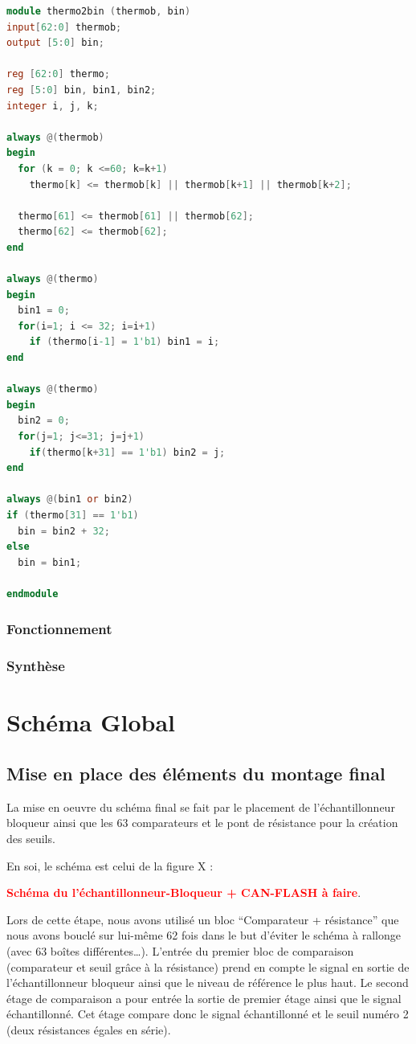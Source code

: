 \documentclass[11pt]{article}
\begin{document}
\begin{lstlisting}[language=Verilog]
module thermo2bin (thermob, bin)
input[62:0] thermob;
output [5:0] bin;

reg [62:0] thermo;
reg [5:0] bin, bin1, bin2;
integer i, j, k;

always @(thermob)
begin
  for (k = 0; k <=60; k=k+1)
    thermo[k] <= thermob[k] || thermob[k+1] || thermob[k+2];

  thermo[61] <= thermob[61] || thermob[62];
  thermo[62] <= thermob[62];
end

always @(thermo)
begin
  bin1 = 0;
  for(i=1; i <= 32; i=i+1)
    if (thermo[i-1] = 1'b1) bin1 = i;
end

always @(thermo)
begin
  bin2 = 0;
  for(j=1; j<=31; j=j+1)
    if(thermo[k+31] == 1'b1) bin2 = j;
end

always @(bin1 or bin2)
if (thermo[31] == 1'b1)
  bin = bin2 + 32;
else
  bin = bin1;

endmodule

\end{lstlisting}

\subsubsection{Fonctionnement}
\subsubsection{Synth\`ese}

\section{Sch\'ema Global}
\subsection{Mise en place des \'el\'ements du montage final}
La mise en oeuvre du sch\'ema final se fait par le placement de l’\'echantillonneur bloqueur
ainsi que les 63 comparateurs et le pont de r\'esistance pour la cr\'eation des seuils.

En soi, le sch\'ema est celui de la figure X :

\begin{center}
\textbf{\textcolor{red}{Sch\'ema du l'\'echantillonneur-Bloqueur + CAN-FLASH \`a faire}}.\\
\end{center}
Lors de cette \'etape, nous avons utilis\'e un bloc ``Comparateur + r\'esistance'' que nous avons boucl\'e
sur lui-m\^eme 62 fois dans le but d’\'eviter le sch\'ema \`a rallonge (avec 63 bo\^ites diff\'erentes…).
L’entr\'ee du premier bloc de comparaison (comparateur et seuil gr\^ace \`a la r\'esistance) prend en compte
le signal en sortie de l’\'echantillonneur bloqueur ainsi que le niveau de r\'ef\'erence le plus haut.
Le second \'etage de comparaison a pour entr\'ee la sortie de premier \'etage ainsi que le signal \'echantillonn\'e.
Cet \'etage compare donc le signal \'echantillonn\'e et le seuil num\'ero 2 (deux r\'esistances \'egales en s\'erie).
\end{document}
